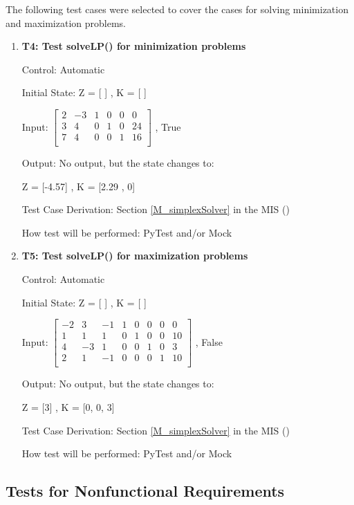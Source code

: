 \documentclass[12pt, titlepage]{article}
\begin{document}
The following test cases were selected to cover the cases for solving 
minimization and maximization problems.

\begin{enumerate}
	
	\item{\textbf{T4: Test solveLP() for minimization problems}}

	Control: Automatic
	
	Initial State: Z = [ ] , K = [ ]
	
	Input: 	$\begin{bmatrix}
	2 & -3 & 1 & 0 & 0 & 0\\
	3 & 4 & 0 & 1 & 0 & 24\\
	7 & 4 & 0 & 0 & 1 & 16\\
	\end{bmatrix}$ , True 
	
	Output: No output, but the state changes to:
	
	Z = [-4.57] , K = [2.29 , 0]
	
	Test Case Derivation: Section \ref{M_simplexSolver} in the MIS 
	(\cite{losms-mis})
	
	How test will be performed: PyTest and/or Mock
	
	\item{\textbf{T5: Test solveLP() for maximization problems}}
	
	Control: Automatic
	
	Initial State: Z = [ ] , K = [ ]
	
	Input: 	$\begin{bmatrix}
	-2 & 3 & -1 & 1 & 0 & 0 & 0 & 0\\
	1 & 1 & 1 & 0 & 1 & 0 & 0 & 10\\
	4 & -3 & 1 & 0 & 0 & 1 & 0 & 3\\
	2 & 1 & -1 & 0 & 0 & 0 & 1 & 10\\
	\end{bmatrix}$ , False 
	
	Output: No output, but the state changes to:
	
	Z = [3] , K = [0, 0, 3]
	
	Test Case Derivation: Section \ref{M_simplexSolver} in the MIS 
	(\cite{losms-mis})
	
	How test will be performed: PyTest and/or Mock
		
\end{enumerate}

\subsection{Tests for Nonfunctional Requirements}
\end{document}
